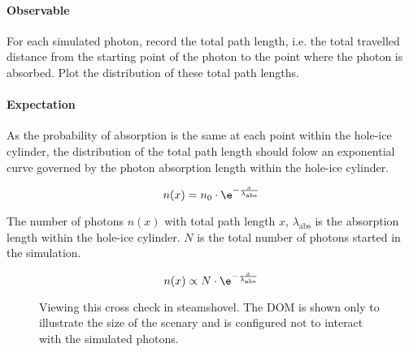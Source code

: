 

\paragraph{Observable} For each simulated photon, record the total path length, i.e. the total travelled distance from the starting point of the photon to the point where the photon is absorbed. Plot the distribution of these total path lengths.

\paragraph{Expectation} As the probability of absorption is the same at each point within the hole-ice cylinder, the distribution of the total path length should folow an exponential curve governed by the photon absorption length within the hole-ice cylinder.


$$
  n(x) = n_0 \cdot \e^{-\frac{x}{\lambda_\text{abs}}}
$$

The number of photons $n(x)$ with total path length $x$, $\lambda_\text{abs}$ is the absorption length within the hole-ice cylinder. $N$ is the total number of photons started in the simulation.

$$
  n(x) \propto N \cdot \e^{-\frac{x}{\lambda_\text{abs}}}
$$

\begin{figure}
  \caption{Viewing this cross check in steamshovel. The DOM is shown only to illustrate the size of the scenary and is configured not to interact with the simulated photons.}
\end{figure}

